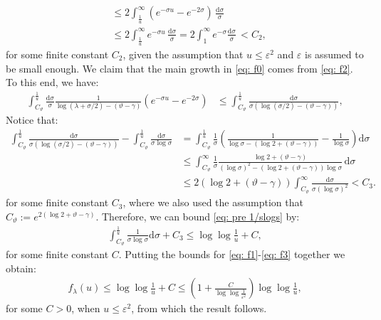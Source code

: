 \documentclass[a4paper,reqno,11pt]{amsart}
\makeatletter
\renewenvironment{proof}[1][\proofname]{\par
\pushQED{\qed}%
\normalfont \topsep4\p@\@plus4\p@\relax
\trivlist
\item[\hskip\labelsep
\bfseries
#1\@addpunct{.}]\ignorespaces
}{%
\popQED\endtrivlist\@endpefalse
}
\numberwithin{equation}{section}
\theoremstyle{mytheorem}
\newcommand{\gl}{\lambda}
\newcommand{\gs}{\sigma}
\renewcommand{\epsilon}{\varepsilon}
\renewcommand{\theta}{\vartheta}
\newcommand\ra{\left(}
\newcommand\rb{\right)}
\newcommand\dd{\mathrm{d}}
\newcommand{\f}{\frac}
\newcommand{\dlog}{\log\log}
\makeatother
\begin{document}
{\begin{proof}
\begin{align*}
        & \le 
        2 \int^\infty_\frac{1}{u} (e^{-\gs u}-e^{-2\gs}) \,   \frac{\dd\gs}{\gs}\\
        & \le
        2 \int^\infty_\frac{1}{u}  e^{-\gs u}\,  \frac{\dd\gs}{\gs}
        =
        2 \int^\infty_1   e^{-\gs } \frac{\dd\gs}{\gs} \, <C_2,
    \end{align*}
    for some finite constant $C_2$, given the assumption that $u\leq \epsilon^2$ and $\epsilon$ is assumed to 
    be small enough. 
We claim that the main growth in \eqref{eq: f0} comes from  \eqref{eq: f2}. To this end, we have:
    \begin{align}\label{eq: pre 1/slogs}
    \int^{\frac{1}{u}}_{C_{\theta}} 
    \frac{\dd\gs }{\gs}
    \frac{1}{\log(\gl+\gs/2)-(\theta-\gamma)} 
    (e^{-\gs u}-e^{-2\gs})
    & \le
    \int^{\frac{1}{u}}_{C_{\theta}} 
    \frac{\dd\gs }{\gs \ra \log(\gs/2)-(\theta-\gamma) \rb},
    \end{align}
    Notice that:
    \begin{align*}
        \int^{\frac{1}{u}}_{C_{\theta}} 
        \frac{\dd\gs}{\gs \ra \log(\gs/2)-(\theta-\gamma) \rb} - \int^{\frac{1}{u}}_{C_{\theta}}  \f{\dd\gs}{\gs \log\gs}
        & = \int^{\f{1}{u} }_{C_{\theta} } \f{1}{\gs} \ra \f{1}{\log\gs - \ra \log 2 + (\theta-\gamma) \rb } -\f{ 1 }{ \log\gs } \rb \dd\gs\\
        & \le \int^{\infty }_{C_{\theta} }\f{1}{\gs} \f{ \log 2+(\theta-\gamma) }{ \ra \log \gs \rb^2 -\ra \log 2+(\theta-\gamma) \rb \log\gs } \, \dd\gs\\
        & \le 2\ra \log 2+ (\theta-\gamma) \rb \int^{\infty }_{C_{\theta} }  \f{ \dd\gs }{ \gs \ra \log \gs \rb^2  }
        < C_3.
    \end{align*}
    for some finite constant $C_3$, where we also used the assumption that $C_\theta:=e^{2\ra \log 2 + \theta-\gamma \rb }$.
    Therefore, we can bound \eqref{eq: pre 1/slogs} by:
    \begin{align*}
      \int^{\frac{1}{u}}_{C_{\theta}} \f{1}{\gs\log\gs} \dd \gs +C_3   
    \leq \log\log \f{1}{u} + C,
       \end{align*}
       for some finite constant $C$.
    Putting the bounds for \eqref{eq: f1}-\eqref{eq: f3} together we obtain:
    \begin{align*}
        f_\gl(u) \le  \dlog\f{1}{u}+C \le (1+\f{C}{\dlog \f{1}{\epsilon^2}})\dlog \f{1}{u},
    \end{align*}
    for some $C>0$, when $u\leq \epsilon^2$, from which the result follows.
        \end{proof}

}
\end{document}
